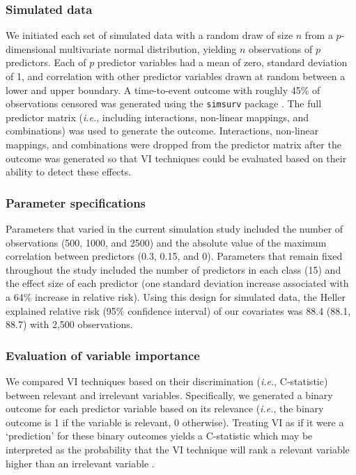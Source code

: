 \documentclass{article}\usepackage[]{graphicx}\usepackage[]{xcolor}
\newcommand{\ie}{\textit{i.e.}}
\begin{document}
\subsubsection{Simulated data}

We initiated each set of simulated data with a random draw of size $n$ from a $p$-dimensional multivariate normal distribution, yielding $n$ observations of $p$ predictors. Each of $p$ predictor variables had a mean of zero, standard deviation of 1, and correlation with other predictor variables drawn at random between a lower and upper boundary. A time-to-event outcome with roughly 45\% of observations censored was generated using the \texttt{simsurv} package \citep{simsurv, simsurv_paper}. The full predictor matrix (\ie, including interactions, non-linear mappings, and combinations) was used to generate the outcome. Interactions, non-linear mappings, and combinations were dropped from the predictor matrix after the outcome was generated so that VI techniques could be evaluated based on their ability to detect these effects.

\subsubsection{Parameter specifications}




Parameters that varied in the current simulation study included the number of observations (500, 1000, and 2500) and the absolute value of the maximum correlation between predictors (0.3, 0.15, and 0). Parameters that remain fixed throughout the study included the number of predictors in each class (15) and the effect size of each predictor (one standard deviation increase associated with a 64\% increase in relative risk). Using this design for simulated data, the Heller explained relative risk (95\% confidence interval) of our covariates was 88.4 (88.1, 88.7) \citep{heller2012measure} with 2,500 observations.

\subsubsection{Evaluation of variable importance}

We compared VI techniques based on their discrimination (\ie, C-statistic) between relevant and irrelevant variables. Specifically, we generated a binary outcome for each predictor variable based on its relevance (\ie, the binary outcome is 1 if the variable is relevant, 0 otherwise). Treating VI as if it were a ‘prediction’ for these binary outcomes yields a C-statistic which may be interpreted as the probability that the VI technique will rank a relevant variable higher than an irrelevant variable \citep{harrell1982evaluating}.
\end{document}
